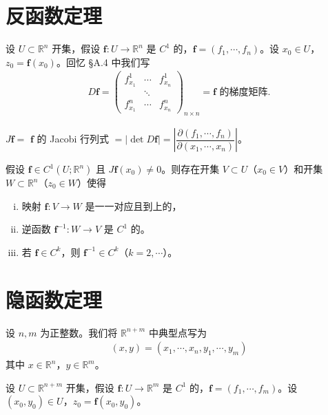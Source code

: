 \documentclass[../main.tex]{subfiles}
\begin{document}
\section{反函数定理}\label{section:appC-反函数}

设 $U\subset\mathbb{R}^n$ 开集，假设 $\mathbf{f}:U\to\mathbb{R}^n$ 是 $C^1$ 的，$\mathbf{f}=(f_1,\cdots,f_n)$。设 $x_0\in U$，$z_0=\mathbf{f}(x_0)$。回忆 \S A.4 中我们写
\begin{align*}
D\mathbf{f}=\begin{pmatrix}
f^1_{x_1} & \cdots & f^1_{x_n}\\
& \ddots & \\
f^n_{x_1} & \cdots & f^n_{x_n}
\end{pmatrix}_{n\times n}=\mathbf{f}\text{ 的梯度矩阵}.
\end{align*}

\begin{definition}\label{definition:appC-Jacobian}
$J\mathbf{f}=$ $\mathbf{f}$ 的 Jacobi 行列式 $=|\det D\mathbf{f}|=\left|\dfrac{\partial(f_1,\cdots,f_n)}{\partial(x_1,\cdots,x_n)}\right|$。
\end{definition}

\begin{theorem}[反函数定理]\label{theorem:appC-反函数}假设 $\mathbf{f}\in C^1(U;\mathbb{R}^n)$ 且 $J\mathbf{f}(x_0)\neq 0$。则存在开集 $V\subset U$（$x_0\in V$）和开集 $W\subset\mathbb{R}^n$（$z_0\in W$）使得
\begin{enumerate}[(i)]
\item 映射 $\mathbf{f}:V\to W$ 是一一对应且到上的，
\item 逆函数 $\mathbf{f}^{-1}:W\to V$ 是 $C^1$ 的。
\item 若 $\mathbf{f}\in C^k$，则 $\mathbf{f}^{-1}\in C^k$（$k=2,\cdots$）。
\end{enumerate}
\end{theorem}

\section{隐函数定理}\label{section:appC-隐函数}

设 $n,m$ 为正整数。我们将 $\mathbb{R}^{n+m}$ 中典型点写为
\begin{align*}
(x,y)=(x_1,\cdots,x_n,y_1,\cdots,y_m)
\end{align*}
其中 $x\in\mathbb{R}^n$，$y\in\mathbb{R}^m$。

设 $U\subset\mathbb{R}^{n+m}$ 开集，假设 $\mathbf{f}:U\to\mathbb{R}^m$ 是 $C^1$ 的，$\mathbf{f}=(f_1,\cdots,f_m)$。设 $(x_0,y_0)\in U$，$z_0=\mathbf{f}(x_0,y_0)$。
\end{document}
